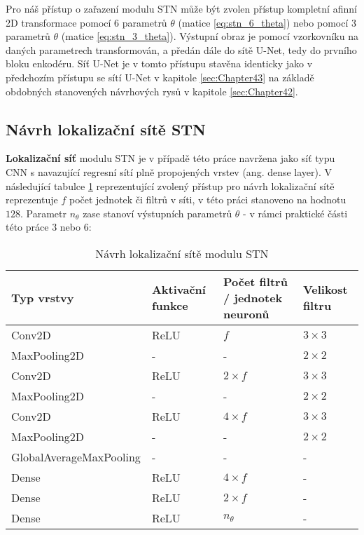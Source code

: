 Pro náš přístup o zařazení modulu STN může být zvolen přístup kompletní afinní 2D transformace pomocí 6 parametrů $\theta$ (matice \ref{eq:stn_6_theta}) nebo pomocí 3 parametrů $\theta$ (matice \ref{eq:stn_3_theta}). Výstupní obraz je pomocí vzorkovníku na daných parametrech transformován, a předán dále do sítě U-Net, tedy do prvního bloku enkodéru. Síť U-Net je v tomto přístupu stavěna identicky jako v předchozím přístupu se sítí U-Net v kapitole \ref{sec:Chapter43} na základě obdobných stanovených návrhových rysů v kapitole \ref{sec:Chapter42}.

\subsection{Návrh lokalizační sítě STN}

\textbf{Lokalizační síť} modulu STN je v případě této práce navržena jako síť typu CNN s navazující regresní sítí plně propojených vrstev (ang. dense layer). V následující tabulce \ref{fig:stn_loc_net} reprezentující zvolený přístup pro návrh lokalizační sítě reprezentuje $f$ počet jednotek či filtrů v síti, v této práci stanoveno na hodnotu $128$. Parametr $n_{\theta}$ zase stanoví výstupních parametrů $\theta$ - v rámci praktické části této práce $3$ nebo $6$:

\begin{table}[H]
\centering
\begin{tabular}{@{}llll@{}}
\toprule
Typ vrstvy & Aktivační funkce & Počet filtrů / jednotek neuronů & Velikost filtru \\ \midrule
Conv2D & ReLU & $f$ & $3 \times 3$ \\
MaxPooling2D & - & - & $2 \times 2$ \\
Conv2D & ReLU & $2\times f$ & $3 \times 3$ \\
MaxPooling2D & - & - & $2 \times 2$ \\
Conv2D & ReLU & $4\times f$ & $3 \times 3$ \\
MaxPooling2D & - & - & $2 \times 2$ \\
GlobalAverageMaxPooling & - & - & - \\
\bottomrule
Dense & ReLU & $4\times f$ & - \\
Dense & ReLU & $2\times f$ & - \\
Dense & ReLU & $n_{\theta}$ & - \\
\bottomrule
\end{tabular}
\caption[Návrh lokalizační sítě modulu STN] { Návrh lokalizační sítě modulu STN }
\label{fig:stn_loc_net}
\end{table}

